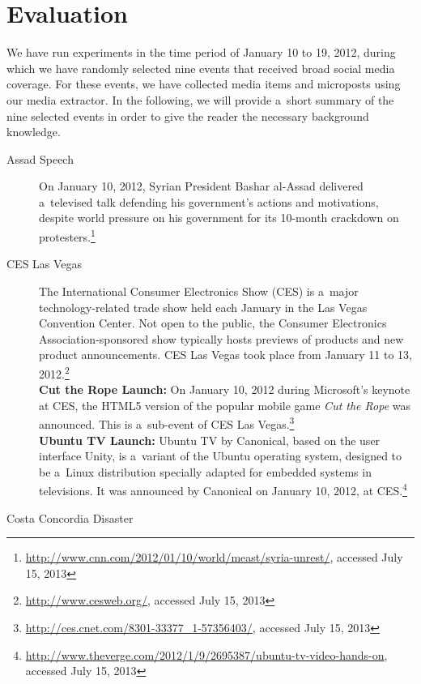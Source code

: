 \section{Evaluation}

We have run experiments in the time period of January 10 to 19, 2012,
during which we have randomly selected nine events
that received broad social media coverage.
For these events, we have collected media items and microposts
using our media extractor.
In the following, we will provide a~short summary of the nine selected events
in order to give the reader the necessary background knowledge.

\begin{description}
  \item[Assad Speech]
       On January 10, 2012, Syrian President Bashar al-Assad
       delivered a~televised talk defending his
       government's actions and motivations, despite world
       pressure on his government for its 10-month
       crackdown on
       protesters.\footnote{\url{http://www.cnn.com/2012/01/10/world/meast/syria-unrest/},
       accessed July 15, 2013}
  \item[CES Las Vegas]
       The International Consumer Electronics Show (CES) is
       a~major technology-related trade show held each January
       in the Las Vegas Convention Center. Not open to the public,
       the Consumer Electronics Association-sponsored show
       typically hosts previews of products and new product
       announcements.
       CES Las Vegas took place from January 11 to 13,
       2012.\footnote{\url{http://www.cesweb.org/},
       accessed July 15, 2013}\\
       \textbf{Cut the Rope Launch:}
       On January 10, 2012 during Microsoft's keynote at CES, the
       HTML5 version of the popular mobile game \textit{Cut the
       Rope} was announced. This is a~sub-event of CES Las
       Vegas.\footnote{\url{http://ces.cnet.com/8301-33377_1-57356403/},
       accessed July 15, 2013}\\       
       \textbf{Ubuntu TV Launch:}
       Ubuntu TV by Canonical, based on the user interface Unity,
       is a~variant of the Ubuntu operating system, designed to be
       a~Linux distribution specially adapted for embedded systems
       in televisions. It was announced by Canonical on January
       10, 2012, at
       CES.\footnote{\url{http://www.theverge.com/2012/1/9/2695387/ubuntu-tv-video-hands-on},
       accessed July 15, 2013}       
  \item[Costa Concordia Disaster]

\end{description}
